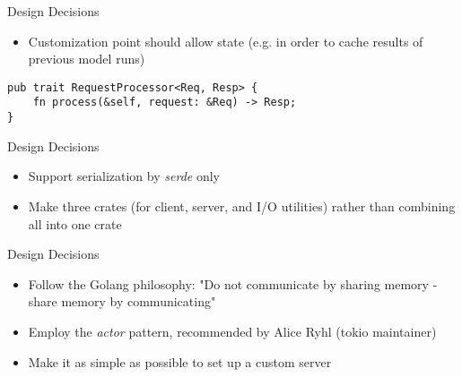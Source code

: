 \documentclass{beamer}
\begin{document}
\begin{frame}[fragile]{Design Decisions}
  \begin{itemize}[<+->]
    \item<1> Customization point should allow state (e.g. in order to cache results of previous model runs)
  \end{itemize}
  \begin{mdframed}[backgroundcolor=light-gray, roundcorner=10pt,leftmargin=1, rightmargin=1, innerleftmargin=1, innerrightmargin=1, innertopmargin=1,innerbottommargin=1, outerlinewidth=1, linecolor=light-gray]
    \begin{lstlisting}[basicstyle=\tiny,]
pub trait RequestProcessor<Req, Resp> {
    fn process(&self, request: &Req) -> Resp;
}
    \end{lstlisting}
  \end{mdframed}
\end{frame}

\begin{frame}{Design Decisions}
  \begin{itemize}[<+->]
    \item<1> Support serialization by \emph{serde} only
    \item<2> Make three crates (for client, server, and I/O utilities) rather than combining all into one crate
  \end{itemize}
\end{frame}

\begin{frame}{Design Decisions}
  \begin{itemize}
    \item<1> Follow the Golang philosophy: "Do not communicate by sharing memory - share memory by communicating"
    \item<2> Employ the \emph{actor} pattern, recommended by Alice Ryhl (tokio maintainer)
    \item<3> Make it as simple as possible to set up a custom server
  \end{itemize}
\end{frame}
\end{document}
